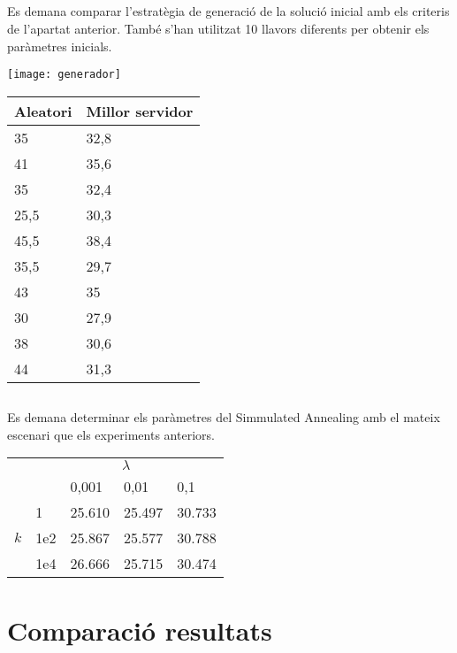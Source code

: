 \documentclass[a4paper, 12pt]{article}
\begin{document}
\newpage
\subsection{}
Es demana comparar l'estratègia de generació de la solució inicial amb els criteris de l'apartat anterior. També s'han utilitzat 10
llavors diferents per obtenir els paràmetres inicials. 

\begin{minipage}{\textwidth}
\centering
\begin{minipage}[b]{0.45\linewidth}
\texttt{[image: generador]}
\end{minipage}
\hfill
\begin{minipage}[b]{0.45\linewidth}
	\centering
	\begin{tabular}{l || l}
		Aleatori & Millor servidor \\
		\hline
		35 & 32,8 \\
		41 & 35,6 \\
		35 & 32,4 \\
		25,5 & 30,3 \\
		45,5 & 38,4 \\
		35,5 & 29,7 \\
		43 & 35 \\
		30 & 27,9 \\
		38 & 30,6 \\ 
		44 & 31,3 \\
	\end{tabular}
\end{minipage}
\end{minipage}

\subsection{}
Es demana determinar els paràmetres del Simmulated Annealing amb el mateix escenari que els experiments
anteriors.

\begin{table}[h!]
\begin{tabular}{l | l | l | l | l|}
	\multicolumn{1}{c}{} & \multicolumn{4}{c}{$\lambda$} \\
	\cline{3-5}
	\multicolumn{2}{c|}{} & 0,001 & 0,01 & 0,1 \\
	\cline{2-5}
	\multirow{3}{*}{$k$}
	& 1 & \cellcolor{Green!50} 25.610 & \cellcolor{Green} 25.497 & \cellcolor{Red!60}30.733 \\
	& 1e2 & \cellcolor{Goldenrod!70}25.867 & \cellcolor{Green!60}25.577 & \cellcolor{Red!60}30.788 \\
	& 1e4 & \cellcolor{Goldenrod}26.666 & \cellcolor{Green!40}25.715 & \cellcolor{Red!60}30.474 \\
	\cline{2-5}
\end{tabular}
\end{table}

\section{Comparació resultats}
\end{document}
